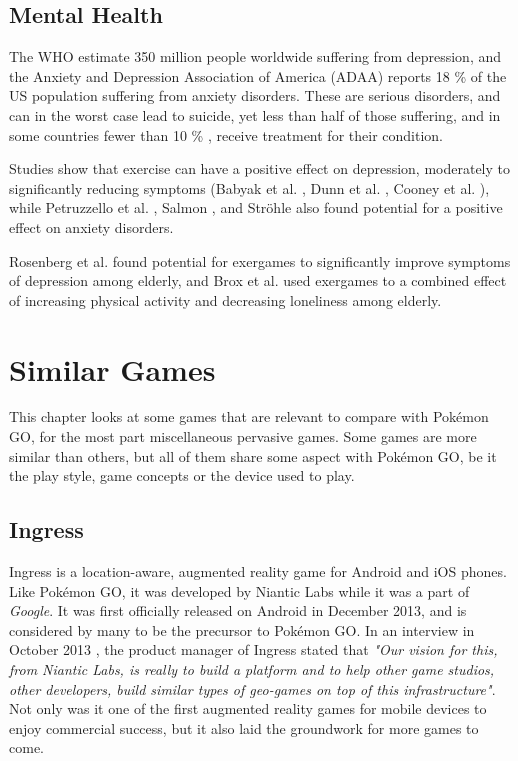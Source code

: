 \section{Mental Health}
\label{sec:lit-study-mental-health}

The WHO \cite{WHOdepression} estimate 350 million people worldwide suffering from depression, and the Anxiety and Depression Association of America (ADAA) \cite{ADAAanxiety} reports 18 \% of the US population suffering from anxiety disorders. These are serious disorders, and can in the worst case lead to suicide, yet less than half of those suffering, and in some countries fewer than 10 \% \cite{WHOdepression}, receive treatment for their condition.

Studies show that exercise can have a positive effect on depression, moderately to significantly reducing symptoms (Babyak et al. \cite{babyak2000exercise}, Dunn et al. \cite{dunn2005exercise}, Cooney et al. \cite{cooney2014exercise}), while Petruzzello et al. \cite{petruzzello1991meta}, Salmon \cite{salmon2001effects}, and Ströhle \cite{strohle2009physical} also found potential for a positive effect on anxiety disorders.

Rosenberg et al. \cite{rosenberg2010exergames} found potential for exergames to significantly improve symptoms of depression among elderly, and Brox et al. \cite{brox2011exergames} used exergames to a combined effect of increasing physical activity and decreasing loneliness among elderly.


\chapter{Similar Games}
\label{chapter:lit-study-similar-games}

This chapter looks at some games that are relevant to compare with Pokémon GO, for the most part miscellaneous pervasive games. Some games are more similar than others, but all of them share some aspect with Pokémon GO, be it the play style, game concepts or the device used to play.

\section{Ingress}
\label{sec:ingress}

Ingress is a location-aware, augmented reality game for Android and iOS phones. Like Pokémon GO, it was developed by Niantic Labs while it was a part of \emph{Google}. It was first officially released on Android in December 2013, and is considered by many to be the precursor to Pokémon GO. In an interview in October 2013 \cite{gamasutraBadger}, the product manager of Ingress stated that \emph{"Our vision for this, from Niantic Labs, is really to build a platform and to help other game studios, other developers, build similar types of geo-games on top of this infrastructure"}. Not only was it one of the first augmented reality games for mobile devices to enjoy commercial success, but it also laid the groundwork for more games to come.

